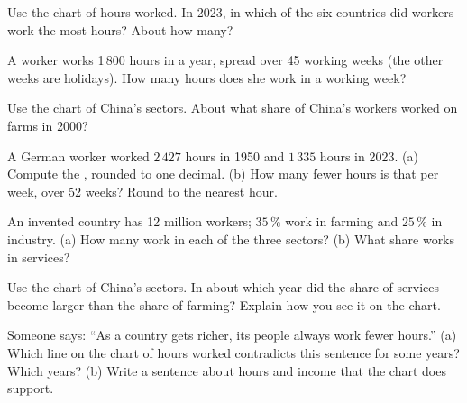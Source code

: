 \begin{exercise}[$\star$]\label{exo:g6:school-and-work:2}
Use the chart of hours worked. In 2023, in which of the six countries did
workers work the most hours? About how many?
\end{exercise}

\begin{exercise}[$\star$]\label{exo:g6:school-and-work:3}
A worker works 1\,800 hours in a year, spread over 45 working weeks (the other
weeks are holidays). How many hours does she work in a working week?
\end{exercise}

\begin{exercise}[$\star$]\label{exo:g6:school-and-work:4}
Use the chart of China's sectors. About what share of China's workers worked on
farms in 2000?
\end{exercise}

\begin{exercise}[$\star\star$]\label{exo:g6:school-and-work:5}
A German worker worked $2\,427$ hours in 1950 and $1\,335$ hours in 2023.
(a) Compute the , rounded to one decimal. (b) How many fewer hours
is that per week, over 52 weeks? Round to the nearest hour.
\end{exercise}

\begin{exercise}[$\star\star$]\label{exo:g6:school-and-work:6}
An invented country has 12 million workers; $35\,\%$ work in farming and
$25\,\%$ in industry. (a) How many work in each of the three sectors? (b) What
share works in services?
\end{exercise}

\begin{exercise}[$\star\star$]\label{exo:g6:school-and-work:7}
Use the chart of China's sectors. In about which year did the share of services
become larger than the share of farming? Explain how you see it on the chart.
\end{exercise}

\begin{exercise}[$\star\star$]\label{exo:g6:school-and-work:8}
Someone says: ``As a country gets richer, its people always work fewer hours.''
(a) Which line on the chart of hours worked contradicts this sentence for some
years? Which years? (b) Write a sentence about hours and income that the chart
does support.
\end{exercise}

